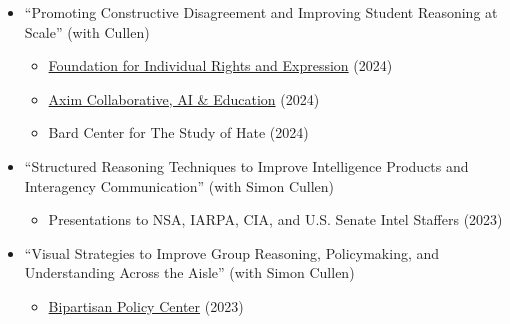 \documentclass[11pt,letterpaper]{article}
\begin{document}
\begin{itemize}
    \item ``Promoting Constructive Disagreement and Improving Student Reasoning at Scale'' (with Cullen)
    \begin{itemize}
        \item \href{https://www.thefire.org/get-involved/events/2024-fire-faculty-network-conference}{Foundation for Individual Rights and Expression} (2024)
        \item \href{https://www.axim.org/news/ai-education}{Axim Collaborative, AI \& Education} (2024)
        \item Bard Center for The Study of Hate (2024)
    \end{itemize}

    \item ``Structured Reasoning Techniques to Improve Intelligence Products and Interagency Communication'' (with Simon Cullen)
    \begin{itemize}
        \item Presentations to NSA, IARPA, CIA, and U.S. Senate Intel Staffers (2023)
    \end{itemize}

    \item ``Visual Strategies to Improve Group Reasoning, Policymaking, and Understanding Across the Aisle'' (with Simon Cullen)
    \begin{itemize}
        \item \href{https://bipartisanpolicy.org}{Bipartisan Policy Center} (2023)
    \end{itemize}
\end{itemize}
\end{document}
